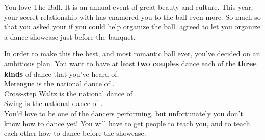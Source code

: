 \documentclass[green]{NeptuneBall}
\begin{document}
\name{\gDance{}}

You love The \cExExKing{} Ball. It is an annual event of great beauty and culture. This year, your secret relationship with \cDiplomat{} has enamored you to the ball even more. So much so that you asked your \cKing{\parent} if you could help organize the ball. \cKing{} agreed to let you organize a dance showcase just before the banquet.

In order to make this the best, and most romantic ball ever, you've decided on an ambitious plan.  You want to have at least {\bf two couples} dance each of the {\bf three  kinds} of dance that you've heard of.\\

Merengue is the national dance of \pAtlantis{}.\\
Cross-step Waltz is the national dance of \pPacifica{}.\\
Swing is the national dance of \pAmerica{}.\\

You'd love to be one of the dancers performing, but unfortunately you don't know how to dance yet! You will have to get people to teach you, and to teach each other how to dance before the showcase.
\end{document}
